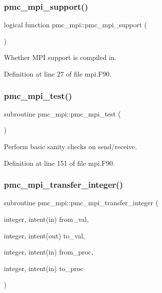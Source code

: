 \subsubsection{\texorpdfstring{pmc\+\_\+mpi\+\_\+support()}{pmc\_mpi\_support()}}
{\footnotesize\ttfamily logical function pmc\+\_\+mpi\+::pmc\+\_\+mpi\+\_\+support (\begin{DoxyParamCaption}{ }\end{DoxyParamCaption})}



Whether M\+PI support is compiled in. 



Definition at line 27 of file mpi.\+F90.

\mbox{\label{namespacepmc__mpi_a92cc3237c6fa0152c4da6571ba5fdef9}} 
\subsubsection{\texorpdfstring{pmc\+\_\+mpi\+\_\+test()}{pmc\_mpi\_test()}}
{\footnotesize\ttfamily subroutine pmc\+\_\+mpi\+::pmc\+\_\+mpi\+\_\+test (\begin{DoxyParamCaption}{ }\end{DoxyParamCaption})}



Perform basic sanity checks on send/receive. 



Definition at line 151 of file mpi.\+F90.

\mbox{\label{namespacepmc__mpi_a422d1ad4201ca47561e99dcc594207a3}} 
\subsubsection{\texorpdfstring{pmc\+\_\+mpi\+\_\+transfer\+\_\+integer()}{pmc\_mpi\_transfer\_integer()}}
{\footnotesize\ttfamily subroutine pmc\+\_\+mpi\+::pmc\+\_\+mpi\+\_\+transfer\+\_\+integer (\begin{DoxyParamCaption}\item[{integer, intent(in)}]{from\+\_\+val,  }\item[{integer, intent(out)}]{to\+\_\+val,  }\item[{integer, intent(in)}]{from\+\_\+proc,  }\item[{integer, intent(in)}]{to\+\_\+proc }\end{DoxyParamCaption})}



